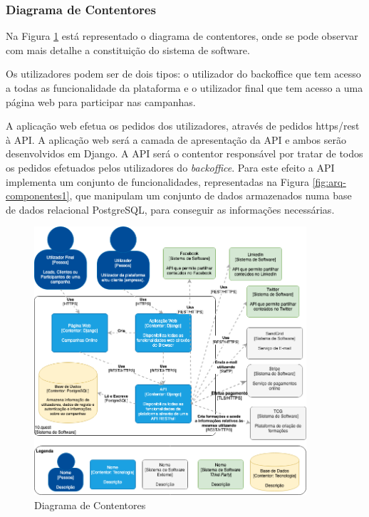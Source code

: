 \subsubsection{Diagrama de Contentores}

Na Figura \ref{fig:arq-contentores} está representado o diagrama de contentores, onde se pode observar com mais detalhe a constituição do sistema de software.

Os utilizadores podem ser de dois tipos: o utilizador do backoffice que tem acesso a todas as funcionalidade da plataforma e o utilizador final que tem acesso a uma página web para participar nas campanhas.

A aplicação web efetua os pedidos dos utilizadores, através de pedidos \acrshort{https}/\acrshort{rest} à API. A aplicação web será a camada de apresentação da API e ambos serão desenvolvidos em Django. A API será o contentor responsável por tratar de todos os pedidos efetuados pelos utilizadores do \textit{backoffice}. Para este efeito a API implementa um conjunto de funcionalidades, representadas na Figura \ref{fig:arq-componentes1}, que manipulam um conjunto de dados armazenados numa base de dados relacional PostgreSQL, para conseguir as informações necessárias.
\newpage

\begin{figure}[ht!]
	\begin{center}
		\includegraphics[width=0.9\textwidth]{img/arq/diagrama-contentores}
		\caption{Diagrama de Contentores}
		\label{fig:arq-contentores}
	\end{center}
\end{figure}


